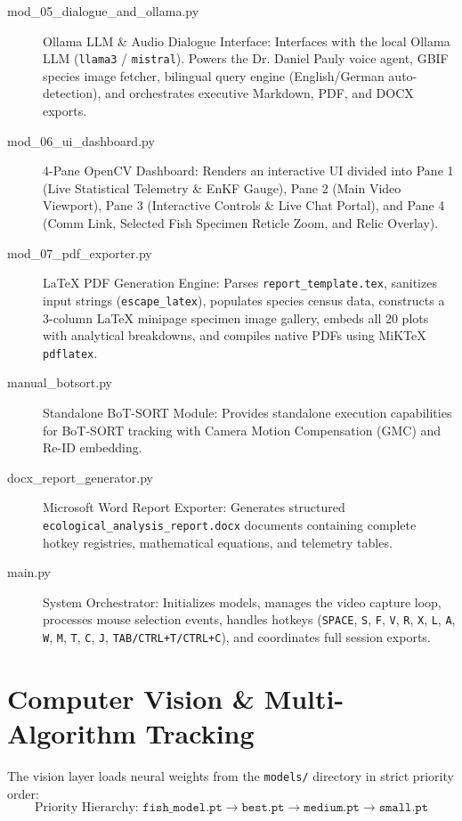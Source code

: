 \documentclass[11pt,a4paper]{article}
\begin{document}
\begin{description}
    \item[mod\_05\_dialogue\_and\_ollama.py] Ollama LLM \& Audio Dialogue Interface:
    Interfaces with the local Ollama LLM (\texttt{llama3} / \texttt{mistral}). Powers the Dr. Daniel Pauly voice agent, GBIF species image fetcher, bilingual query engine (English/German auto-detection), and orchestrates executive Markdown, PDF, and DOCX exports.
    
    \item[mod\_06\_ui\_dashboard.py] 4-Pane OpenCV Dashboard:
    Renders an interactive UI divided into Pane 1 (Live Statistical Telemetry \& EnKF Gauge), Pane 2 (Main Video Viewport), Pane 3 (Interactive Controls \& Live Chat Portal), and Pane 4 (Comm Link, Selected Fish Specimen Reticle Zoom, and Relic Overlay).
    
    \item[mod\_07\_pdf\_exporter.py] LaTeX PDF Generation Engine:
    Parses \texttt{report\_template.tex}, sanitizes input strings (\texttt{escape\_latex}), populates species census data, constructs a 3-column LaTeX minipage specimen image gallery, embeds all 20 plots with analytical breakdowns, and compiles native PDFs using MiKTeX \texttt{pdflatex}.
    
    \item[manual\_botsort.py] Standalone BoT-SORT Module:
    Provides standalone execution capabilities for BoT-SORT tracking with Camera Motion Compensation (GMC) and Re-ID embedding.
    
    \item[docx\_report\_generator.py] Microsoft Word Report Exporter:
    Generates structured \texttt{ecological\_analysis\_report.docx} documents containing complete hotkey registries, mathematical equations, and telemetry tables.
    
    \item[main.py] System Orchestrator:
    Initializes models, manages the video capture loop, processes mouse selection events, handles hotkeys (\texttt{SPACE}, \texttt{S}, \texttt{F}, \texttt{V}, \texttt{R}, \texttt{X}, \texttt{L}, \texttt{A}, \texttt{W}, \texttt{M}, \texttt{T}, \texttt{C}, \texttt{J}, \texttt{TAB/CTRL+T/CTRL+C}), and coordinates full session exports.
\end{description}

\section{Computer Vision \& Multi-Algorithm Tracking}
The vision layer loads neural weights from the \texttt{models/} directory in strict priority order:
\begin{equation}
\text{Priority Hierarchy: } \texttt{fish\_model.pt} \rightarrow \texttt{best.pt} \rightarrow \texttt{medium.pt} \rightarrow \texttt{small.pt}
\end{equation}
\end{document}
